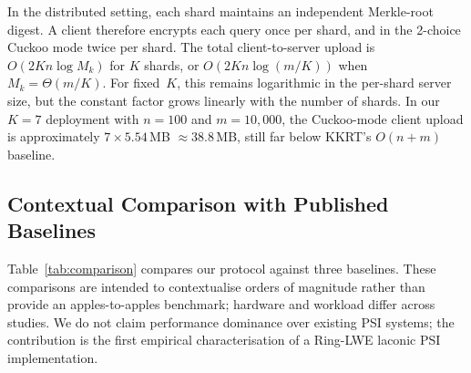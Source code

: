 \documentclass[preprint,12pt]{elsarticle}
\begin{document}
In the distributed setting, each shard maintains an independent Merkle-root
digest. A client therefore encrypts each query once per shard, and in the
2-choice Cuckoo mode twice per shard. The total client-to-server upload is
$O(2K n \log M_k)$ for $K$ shards, or $O(2K n \log(m/K))$ when $M_k=\Theta(m/K)$. For fixed~$K$, this remains logarithmic
in the per-shard server size, but the constant factor grows linearly with
the number of shards. In our $K=7$ deployment with $n=100$ and $m=10{,}000$,
the Cuckoo-mode client upload is approximately $7 \times 5.54$\,MB
$\approx 38.8$\,MB, still far below KKRT's $O(n+m)$ baseline.

\subsection{Contextual Comparison with Published Baselines}
\label{subsec:comparison}

Table~\ref{tab:comparison} compares our protocol against three baselines.
These comparisons are intended to contextualise orders of magnitude rather
than provide an apples-to-apples benchmark; hardware and workload differ
across studies. We do not claim performance dominance over existing PSI
systems; the contribution is the first empirical characterisation of a
Ring-LWE laconic PSI implementation.
\end{document}
